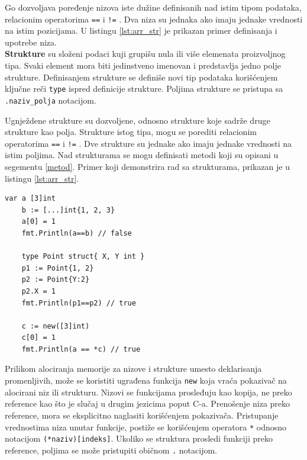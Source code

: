 \documentclass[12pt,oneside]{memoir}
\begin{document}
Go dozvoljava poređenje nizova iste dužine definisanih nad istim tipom podataka, relacionim operatorima \texttt{==} i \texttt{!=} . Dva niza su jednaka ako imaju jednake vrednosti na istim pozicijama. U listingu \ref{lst:arr_str} je prikazan primer definisanja i upotrebe niza.
\\

\textbf{Strukture} su složeni podaci kuji grupišu nula ili više elemenata proizvoljnog tipa. Svaki element mora biti jedinstveno imenovan i predstavlja jedno polje strukture. Definisanjem strukture se definiše novi tip podataka korišćenjem ključne reči \texttt{type} ispred definicije strukture. Poljima strukture se pristupa sa \texttt{.naziv\_polja} notacijom. 

Ugnježdene strukture su dozvoljene, odnosno strukture koje sadrže druge strukture kao polja. Strukture istog tipa, mogu se porediti relacionim operatorima   \texttt{==} i \texttt{!=} . Dve strukture su jednake ako imaju jednake vrednosti na istim poljima. Nad strukturama se mogu definisati metodi koji su opisani u segementu \ref{metod}. Primer koji demonstrira rad sa strukturama, prikazan je u listingu  \ref{lst:arr_str}.

\begin{center}
\begin{lstlisting}[caption=Primer koji demonstrira rad sa nizovima i strukturama, label={lst:arr_str},  backgroundcolor=\color{background}]
	var a [3]int
	b := [...]int{1, 2, 3}
	a[0] = 1
	fmt.Println(a==b) // false

	type Point struct{ X, Y int }
	p1 := Point{1, 2}
	p2 := Point{Y:2}
	p2.X = 1
	fmt.Println(p1==p2) // true

	c := new([3]int)
	c[0] = 1
	fmt.Println(a == *c) // true			
\end{lstlisting}
\end{center}

Prilikom alociranja memorije za nizove i strukture umesto deklarisanja promenljivih, može se koristiti ugrađena funkcija \texttt{new} koja vraća pokazivač na alocirani niz ili strukturu. Nizovi se funkcijama prosleđuju kao kopija, ne preko reference kao što je slučaj u drugim jezicima poput C-a. Prenošenje niza preko reference, mora se eksplicitno naglasiti korišćenjem pokazivača. Pristupanje vrednostima niza unutar funkcije, postiže se korišćenjem operatora \texttt{*} odnosno notacijom \texttt{(*naziv)[indeks]}. Ukoliko se struktura prosledi funkciji preko reference, poljima se može pristupiti običnom \texttt{.} notacijom.
\end{document}
